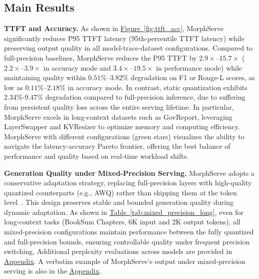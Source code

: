 \documentclass{article}
\newcommand{\system}{{MorphServe}\xspace}
\newcommand{\quant}{\small\textsf{LayerSwapper}\xspace}
\newcommand{\kvc}{\small\textsf{KVResizer}\xspace}
\begin{document}
{%


\subsection{Main Results}


\textbf{TTFT and Accuracy.}
As shown in \hyperref[fig:ttft_acc]{Figure~\ref{fig:ttft_acc}}, {\system} significantly reduces P95 TTFT latency (95th-percentile TTFT latency) while preserving output quality in all model-trace-dataset configurations. Compared to full-precision baselines, {\system} reduces the P95 TTFT by $2.9\times$–$15.7\times$ ($2.2\times$–$3.9\times$ in accuracy mode and $3.4\times$–$19.5\times$ in performance mode) while maintaining quality within $0.51\%$–$3.82\%$ degradation on F1 or Rouge-L scores, as low as $0.11\%$–$2.18\%$ in accuracy mode.
In contrast, static quantization exhibits $2.34\%$-$9.47\%$ degradation compared to full-precision inference, due to suffering from persistent quality loss across the entire serving lifetime. In particular, {\system} excels in long-context datasets such as GovReport, leveraging {\quant} and {\kvc} to optimize memory and computing efficiency. {\system} with different configurations (green stars) visualizes the ability to navigate the latency-accuracy Pareto frontier, offering the best balance of performance and quality based on real-time workload shifts.  


\textbf{Generation Quality under Mixed-Precision Serving.}
MorphServe adopts a conservative adaptation strategy, replacing full-precision layers with high-quality quantized counterparts (e.g., AWQ) rather than skipping them at the token level~\cite{dynamic-layer-selection}. This design preserves stable and bounded generation quality during dynamic adaptation. As shown in \hyperref[tab:mixed_precision_long]{Table~\ref{tab:mixed_precision_long}}, even for long-context tasks (BookSum Chapters, 6K input and 2K output tokens), all mixed-precision configurations maintain performance between the fully quantized and full-precision bounds, ensuring controllable quality under frequent precision switching. Additional perplexity evaluations across models are provided in \hyperref[appendix:eval]{Appendix}. A verbatim example of MorphServe’s output under mixed-precision serving is also in the \hyperref[appendix:eval]{Appendix}.

}
\end{document}
